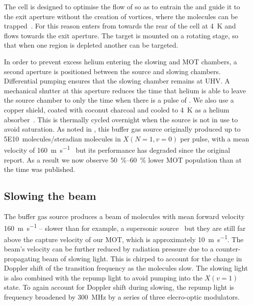 The cell is designed to optimise the flow of \He{} so as to entrain the 
\CaF{} and guide it to the exit aperture without the creation of vortices,
where the molecules can be trapped~\cite{Truppe2018}. For this reason \He{}
enters from towards the rear of the cell at \SI{4}{\kelvin} and flows towards
the exit aperture.  The \Ca{} target is  mounted on a rotating stage, so that
when one region is depleted another can be targeted.

In order to prevent excess helium entering the slowing and MOT chambers, a
second aperture is positioned between the source and slowing chambers.
Differential pumping ensures that the slowing chamber remains at UHV. A
mechanical shutter at this aperture reduces the time that helium is able to
leave the source chamber to only the time when there is a pulse of \CaF{}. We
also use a copper shield, coated with coconut charcoal and cooled to
\SI{4}{\kelvin} as a helium absorber~\cite{doi:10.1116/1.574141}. This is
thermally cycled overnight when the source is not in use to avoid saturation.
As noted in , this buffer gas source originally
produced up to \SI{5E10}{molecules/steradian} molecules in $X(N=1, v=0)$ per
pulse, with a
mean velocity of \SI{160}{\meter\per\second}~\cite{Truppe2018} but its
performance has degraded since the original report. As a result we now observe
\SIrange{50}{60}{\percent} lower MOT population than at the time
 was published.

\subsection{Slowing the beam}

The buffer gas source produces a beam of molecules with mean forward velocity
\SI{160}{\meter\per\second} -- slower than for example, a supersonic
source~\cite{Mathavan2016} but they are still far above the capture velocity of
our MOT, which is approximately \SI{10}{\meter\per\second}. The beam's velocity
can be further reduced by radiation pressure due to a counter-propagating beam
of  slowing light. This is chirped to account for the change in
Doppler shift of the transition frequency as the molecules slow. The slowing
light is also combined with the  repump light to avoid pumping
into the $X(v=1)$ state. To again account for Doppler shift during slowing, the
repump light is frequency broadened by \SI{300}{\mega\hertz} by a series of
three elecro-optic modulators.

